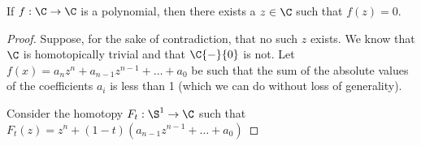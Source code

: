 \begin{theorem}
	If $f:\C\rightarrow\C$ is a polynomial, then there exists a $z\in \C$ such that $f(z)=0$.
	
	\end{theorem}

\begin{proof}
	Suppose, for the sake of contradiction, that no such $z$ exists.  We know that $\C$ is homotopically trivial and that $\C{-}\{0\}$ is not.  Let $f(x) = a_nz^n + a_{n-1}z^{n-1} + \dots + a_0$ be such that the sum of the absolute values of the coefficients $a_i$ is less than 1 (which we can do without loss of generality).
	
	Consider the homotopy $F_t:\S^1\rightarrow\C$ such that $F_t(z)=z^n + (1-t)(a_{n-1}z^{n-1}+\dots + a_0)$
\end{proof}
